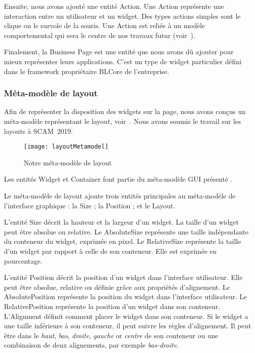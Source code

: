 \documentclass[a4paper]{article}
\begin{document}
Ensuite, nous avons ajouté une entité Action.
Une Action représente une interaction entre un utilisateur et un widget.
Des types actions simples sont le clique ou le survole de la souris.
Une Action est reliée à un modèle comportemental qui sera le centre de nos travaux futur (voir~). 

Finalement, la Business Page est une entité que nous avons dû ajouter pour mieux représenter leurs applications.
C'est un type de widget particulier défini dans le framework propriétaire BLCore de l'entreprise.

\subsubsection{Méta-modèle de layout}
\label{sec:layout}

Afin de représenter la disposition des widgets sur la page,
  nous avons conçus un méta-modèle représentant le layout, voir~.
Nous avons soumis le travail sur les layouts à SCAM~2019\citep{Verh19e}.

\begin{figure}[h]
  \begin{center}
  \texttt{[image: layoutMetamodel]}
  \caption{Notre méta-modèle de layout}
  \label{fig:layoutmetamodel}
  \end{center}
\end{figure}

Les entités Widget et Container font partie du méta-modèle GUI présenté .

Le méta-modèle de layout ajoute trois entités principales au méta-modèle de l'interface graphique : 
    la Size ;
    la Position ; et
    le Layout.

L'entité Size décrit la hauteur et la largeur d'un widget.
La taille d'un widget peut être absolue ou relative.
Le AbsoluteSize représente une taille indépendante du conteneur du widget, exprimée en pixel.
Le RelativeSize représente la taille d'un widget par rapport à celle de son conteneur.
Elle est exprimée en pourcentage.

L'entité Position décrit la position d'un widget dans l'interface utilisateur.
Elle peut être absolue, relative ou définie grâce aux propriétés d'alignement.
Le AbsolutePosition représente la position du widget dans l'interface utilisateur.
Le RelativePosition représente la position d'un widget dans son conteneur.
L'Alignment définit comment placer le widget dans son conteneur.
Si le widget a une taille inférieure à son conteneur, il peut suivre les règles d'alignement.
Il peut être dans le \textit{haut}, \textit{bas}, \textit{droite}, \textit{gauche} or \textit{centre} 
    de son conteneur ou une combinaison de deux alignements, par exemple \textit{bas-droite}.
\end{document}
